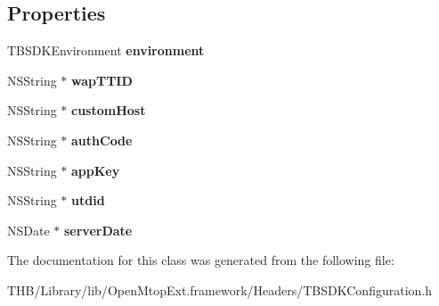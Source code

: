 \subsection*{Properties}
\begin{DoxyCompactItemize}
\item 
\mbox{\label{interface_t_b_s_d_k_configuration_a661b9731c451d466df197fe2ffb46a8d}} 
T\+B\+S\+D\+K\+Environment {\bfseries environment}
\item 
\mbox{\label{interface_t_b_s_d_k_configuration_a35f56af0a628f2b1f7b5777ae8377b28}} 
N\+S\+String $\ast$ {\bfseries wap\+T\+T\+ID}
\item 
\mbox{\label{interface_t_b_s_d_k_configuration_a7174b2211dbbccb7b4569ff7f9a8c124}} 
N\+S\+String $\ast$ {\bfseries custom\+Host}
\item 
\mbox{\label{interface_t_b_s_d_k_configuration_aa49a647a2cec5b1bb3c0be74fc72ef96}} 
N\+S\+String $\ast$ {\bfseries auth\+Code}
\item 
\mbox{\label{interface_t_b_s_d_k_configuration_aa9f991e0af41b2d7a3358e4d08a3f1a9}} 
N\+S\+String $\ast$ {\bfseries app\+Key}
\item 
\mbox{\label{interface_t_b_s_d_k_configuration_acc16e919e9e7a7c38c931130eeeaed53}} 
N\+S\+String $\ast$ {\bfseries utdid}
\item 
\mbox{\label{interface_t_b_s_d_k_configuration_a69b3000636c5513a21bd2ab5f7d16790}} 
N\+S\+Date $\ast$ {\bfseries server\+Date}
\end{DoxyCompactItemize}


The documentation for this class was generated from the following file\+:\begin{DoxyCompactItemize}
\item 
T\+H\+B/\+Library/lib/\+Open\+Mtop\+Ext.\+framework/\+Headers/T\+B\+S\+D\+K\+Configuration.\+h\end{DoxyCompactItemize}
